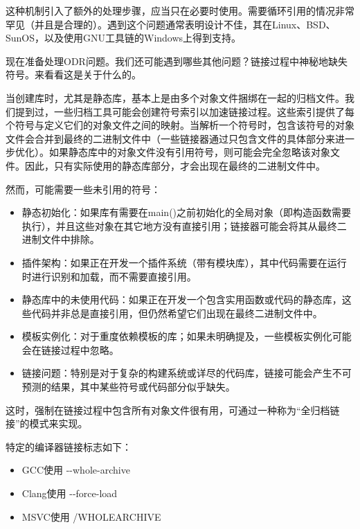 
这种机制引入了额外的处理步骤，应当只在必要时使用。需要循环引用的情况非常罕见（并且是合理的）。遇到这个问题通常表明设计不佳，其在Linux、BSD、SunOS，以及使用GNU工具链的Windows上得到支持。

现在准备处理ODR问题。我们还可能遇到哪些其他问题？链接过程中神秘地缺失符号。来看看这是关于什么的。


当创建库时，尤其是静态库，基本上是由多个对象文件捆绑在一起的归档文件。我们提到过，一些归档工具可能会创建符号索引以加速链接过程。这些索引提供了每个符号与定义它们的对象文件之间的映射。当解析一个符号时，包含该符号的对象文件会合并到最终的二进制文件中（一些链接器通过只包含文件的具体部分来进一步优化）。如果静态库中的对象文件没有引用符号，则可能会完全忽略该对象文件。因此，只有实际使用的静态库部分，才会出现在最终的二进制文件中。

然而，可能需要一些未引用的符号：

\begin{itemize}
\item
静态初始化：如果库有需要在main()之前初始化的全局对象（即构造函数需要执行），并且这些对象在其它地方没有直接引用；链接器可能会将其从最终二进制文件中排除。

\item
插件架构：如果正在开发一个插件系统（带有模块库），其中代码需要在运行时进行识别和加载，而不需要直接引用。

\item
静态库中的未使用代码：如果正在开发一个包含实用函数或代码的静态库，这些代码并非总是直接引用，但仍然希望它们出现在最终二进制文件中。

\item
模板实例化：对于重度依赖模板的库；如果未明确提及，一些模板实例化可能会在链接过程中忽略。

\item
链接问题：特别是对于复杂的构建系统或详尽的代码库，链接可能会产生不可预测的结果，其中某些符号或代码部分似乎缺失。
\end{itemize}

这时，强制在链接过程中包含所有对象文件很有用，可通过一种称为“全归档链接”的模式来实现。

特定的编译器链接标志如下：

\begin{itemize}
\item
GCC使用 -{}-whole-archive

\item
Clang使用 -{}-force-load

\item
MSVC使用 /WHOLEARCHIVE
\end{itemize}

